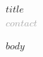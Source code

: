 \documentclass[10pt, letterpaper]{article}
\begin{document}
\begin{center}
  {\namefont\fontsize{16pt}{20pt}\selectfont $title$}\\[4pt]
  {\footnotesize\textcolor{darkgray}{$contact$}}\\[2pt]
  \vspace{4pt}{\color{darkgray}\hrule}
\end{center}

\vspace{2pt}

$body$
\end{document}
